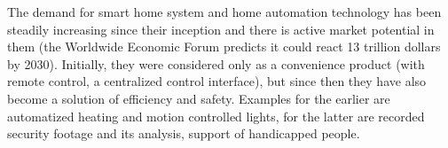 The demand for smart home system and home automation technology has been steadily increasing since their inception and there is active market potential in them (the Worldwide Economic Forum predicts it could react 13 trillion dollars by 2030). Initially, they were considered only as a convenience product (with remote control, a centralized control interface), but since then they have also become a solution of efficiency and safety. Examples for the earlier are automatized heating and motion controlled lights, for the latter are recorded security footage and its analysis, support of handicapped people.


\vfill
\selectthesislanguage

\setcounter{romanPage}{\value{page}}
